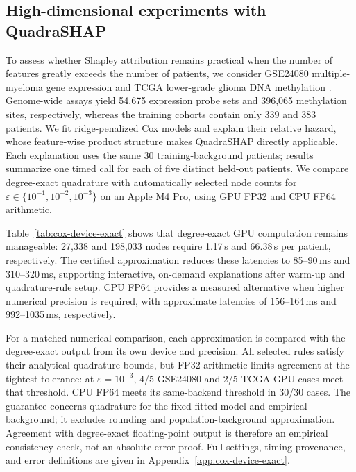 \subsection{High-dimensional experiments with QuadraSHAP}
\label{sec:high-dimensional-quadrashap}

To assess whether Shapley attribution remains practical when the number of
features greatly exceeds the number of patients, we consider GSE24080
multiple-myeloma gene expression and TCGA lower-grade glioma DNA methylation
\cite{geo_gse24080,tcga_lgg_methylation}. Genome-wide assays yield 54,675
expression probe sets and 396,065 methylation sites, respectively, whereas
the training cohorts contain only 339 and 383 patients. We fit ridge-penalized
Cox models and explain their relative hazard, whose feature-wise product
structure makes QuadraSHAP directly applicable. Each explanation uses the
same 30 training-background patients; results summarize one timed call for
each of five distinct held-out patients. We compare degree-exact quadrature
with automatically selected node counts for
$\varepsilon\in\{10^{-1},10^{-2},10^{-3}\}$ on an Apple M4 Pro, using
GPU FP32 and CPU FP64 arithmetic.

Table~\ref{tab:cox-device-exact} shows that degree-exact GPU computation
remains manageable: 27,338 and 198,033 nodes require
1.17\,s and
66.38\,s per patient, respectively.
The certified approximation reduces these latencies to
85--90\,ms and
310--320\,ms,
supporting interactive, on-demand explanations after warm-up and
quadrature-rule setup. CPU FP64 provides a measured alternative when
higher numerical precision is required, with approximate latencies of
156--164\,ms and
992--1035\,ms, respectively.

For a matched numerical comparison, each approximation is compared with
the degree-exact output from its own device and precision. All selected
rules satisfy their analytical quadrature bounds, but FP32 arithmetic
limits agreement at the tightest tolerance: at $\varepsilon=10^{-3}$,
4/5 GSE24080 and
2/5 TCGA GPU cases meet that threshold.
CPU FP64 meets its same-backend threshold in 30/30 cases.
The guarantee concerns quadrature for the fixed fitted model and
empirical background; it excludes rounding and population-background
approximation. Agreement with degree-exact floating-point output is
therefore an empirical consistency check, not an absolute error proof.
Full settings, timing provenance, and error definitions are given in
Appendix~\ref{app:cox-device-exact}.
